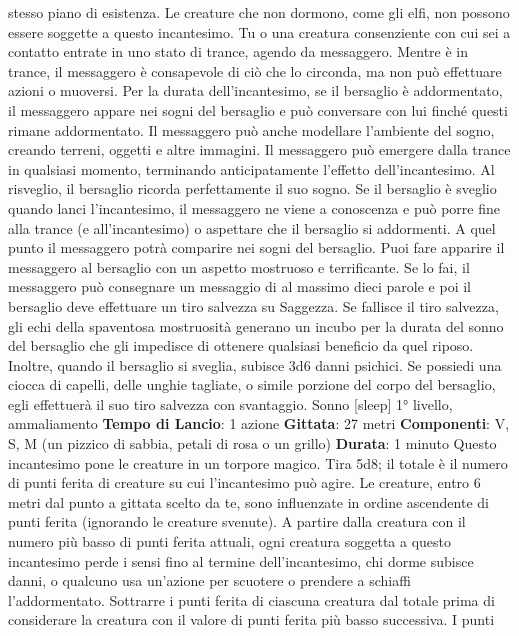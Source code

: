 \begin{multicols}{2}
stesso piano di esistenza. Le creature che non
dormono, come gli elfi, non possono essere soggette a
questo incantesimo. Tu o una creatura consenziente
con cui sei a contatto entrate in uno stato di trance,
agendo da messaggero. Mentre è in trance, il
messaggero è consapevole di ciò che lo circonda, ma
non può effettuare azioni o muoversi.
Per la durata dell’incantesimo, se il bersaglio è
addormentato, il messaggero appare nei sogni del
bersaglio e può conversare con lui finché questi rimane
addormentato. Il messaggero può anche modellare
l’ambiente del sogno, creando terreni, oggetti e altre
immagini. Il messaggero può emergere dalla trance in
qualsiasi momento, terminando anticipatamente l’effetto
dell’incantesimo. Al risveglio, il bersaglio ricorda
perfettamente il suo sogno. Se il bersaglio è sveglio
quando lanci l’incantesimo, il messaggero ne viene a
conoscenza e può porre fine alla trance (e
all’incantesimo) o aspettare che il bersaglio si
addormenti. A quel punto il messaggero potrà
comparire nei sogni del bersaglio.
Puoi fare apparire il messaggero al bersaglio con un
aspetto mostruoso e terrificante. Se lo fai, il
messaggero può consegnare un messaggio di al
massimo dieci parole e poi il bersaglio deve effettuare
un tiro salvezza su Saggezza. Se fallisce il tiro
salvezza, gli echi della spaventosa mostruosità
generano un incubo per la durata del sonno del
bersaglio che gli impedisce di ottenere qualsiasi
beneficio da quel riposo. Inoltre, quando il bersaglio si
sveglia, subisce 3d6 danni psichici.
Se possiedi una ciocca di capelli, delle unghie tagliate,
o simile porzione del corpo del bersaglio, egli effettuerà
il suo tiro salvezza con svantaggio.
Sonno
[sleep]
1° livello, ammaliamento
\textbf{Tempo di Lancio}: 1 azione
\textbf{Gittata}: 27 metri
\textbf{Componenti}: V, S, M (un pizzico di sabbia, petali di
rosa o un grillo)
\textbf{Durata}: 1 minuto
Questo incantesimo pone le creature in un torpore
magico. Tira 5d8; il totale è il numero di punti ferita di
creature su cui l’incantesimo può agire. Le creature,
entro 6 metri dal punto a gittata scelto da te, sono
influenzate in ordine ascendente di punti ferita
(ignorando le creature svenute).
A partire dalla creatura con il numero più basso di punti
ferita attuali, ogni creatura soggetta a questo
incantesimo perde i sensi fino al termine
dell’incantesimo, chi dorme subisce danni, o qualcuno
usa un’azione per scuotere o prendere a schiaffi
l’addormentato. Sottrarre i punti ferita di ciascuna
creatura dal totale prima di considerare la creatura con
il valore di punti ferita più basso successiva. I punti

\end{multicols}
